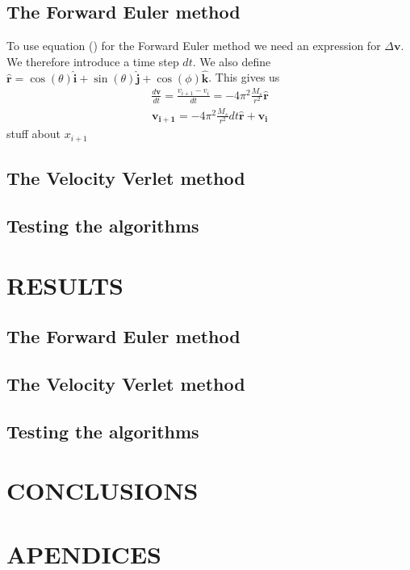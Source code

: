 \documentclass[a4paper]{article}
\begin{document}
\subsection{The Forward Euler method}
To use equation () for the Forward Euler method we need an expression for $\Delta \boldsymbol{v}$. We therefore introduce a time step $dt$. We also define $\boldsymbol{\hat{r}}=\cos(\theta)\boldsymbol{\hat{i}}+\sin(\theta)\boldsymbol{\hat{j}}+\cos(\phi)\boldsymbol{\hat{k}}$. This gives us
\begin{align*}
\frac{d\boldsymbol{v}}{dt}=\frac{v_{i+1}-v_i}{dt}=-4\pi^2\frac{M_s}{r^2}\boldsymbol{\hat{r}}
\end{align*}
\begin{align}
\boldsymbol{v_{i+1}}=-4\pi^2\frac{M_s}{r^2}dt\boldsymbol{\hat{r}}+\boldsymbol{v_i}
\end{align}
stuff about $x_{i+1}$
\subsection{The Velocity Verlet method}
\subsection{Testing the algorithms}



\section{RESULTS}
\subsection{The Forward Euler method}
\subsection{The Velocity Verlet method}
\subsection{Testing the algorithms}



\section{CONCLUSIONS}


\section{APENDICES}
\end{document}
